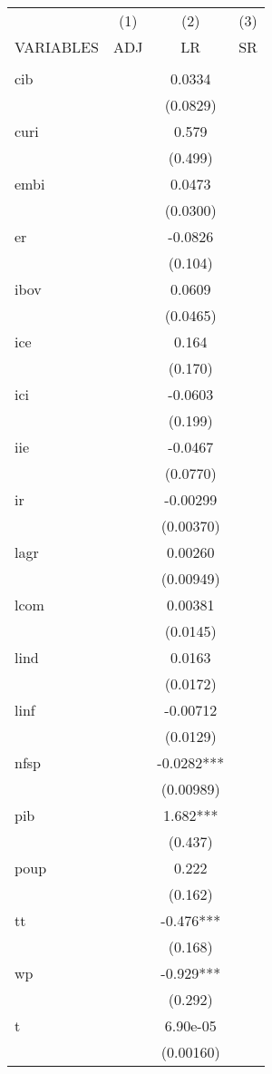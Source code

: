 \begin{tabular}{lccc} \hline
 & (1) & (2) & (3) \\
VARIABLES & ADJ & LR & SR \\ \hline
 &  &  &  \\
cib &  & 0.0334 &  \\
 &  & (0.0829) &  \\
curi &  & 0.579 &  \\
 &  & (0.499) &  \\
embi &  & 0.0473 &  \\
 &  & (0.0300) &  \\
er &  & -0.0826 &  \\
 &  & (0.104) &  \\
ibov &  & 0.0609 &  \\
 &  & (0.0465) &  \\
ice &  & 0.164 &  \\
 &  & (0.170) &  \\
ici &  & -0.0603 &  \\
 &  & (0.199) &  \\
iie &  & -0.0467 &  \\
 &  & (0.0770) &  \\
ir &  & -0.00299 &  \\
 &  & (0.00370) &  \\
lagr &  & 0.00260 &  \\
 &  & (0.00949) &  \\
lcom &  & 0.00381 &  \\
 &  & (0.0145) &  \\
lind &  & 0.0163 &  \\
 &  & (0.0172) &  \\
linf &  & -0.00712 &  \\
 &  & (0.0129) &  \\
nfsp &  & -0.0282*** &  \\
 &  & (0.00989) &  \\
pib &  & 1.682*** &  \\
 &  & (0.437) &  \\
poup &  & 0.222 &  \\
 &  & (0.162) &  \\
tt &  & -0.476*** &  \\
 &  & (0.168) &  \\
wp &  & -0.929*** &  \\
 &  & (0.292) &  \\
t &  & 6.90e-05 &  \\
 &  & (0.00160) &  \\

\end{tabular}
